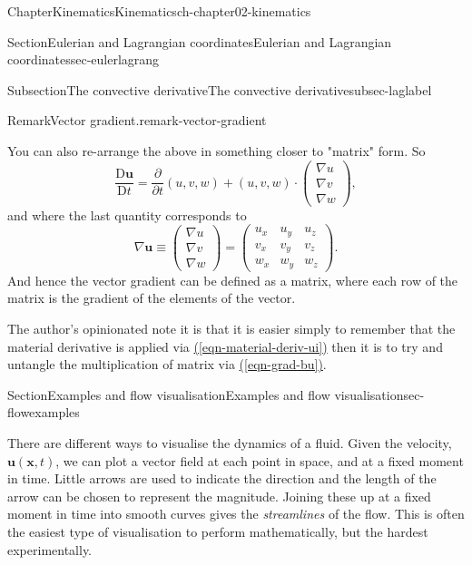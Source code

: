 \documentclass[oneside,10pt,]{book}
\newcommand{\xreffont}{\relax}
\numberwithin{equation}{section}
\newcommand{\DD}[2]{\frac{\mathrm{D}#1}{\mathrm{D}#2}}
\newcommand{\pd}[2]{\frac{\partial#1}{\partial#2}}
\newcommand{\bx}{\boldsymbol{x}}
\newcommand{\bu}{\boldsymbol{u}}
\begin{document}
\begin{chapterptx}{Chapter}{Kinematics}{}{Kinematics}{}{}{ch-chapter02-kinematics}
\begin{sectionptx}{Section}{Eulerian and Lagrangian coordinates}{}{Eulerian and Lagrangian coordinates}{}{}{sec-eulerlagrang}
\begin{subsectionptx}{Subsection}{The convective derivative}{}{The convective derivative}{}{}{subsec-laglabel}
\begin{remark}{Remark}{Vector gradient.}{remark-vector-gradient}
%
\par
You can also re-arrange the above in something closer to "matrix" form. So%
\begin{equation*}
\DD{\bu}{t} = \pd{}{t}(u, v, w) + (u, v, w) \cdot \begin{pmatrix} \nabla u \\ \nabla v \\ \nabla w\end{pmatrix},
\end{equation*}
and where the last quantity corresponds to%
\begin{equation}
\nabla \bu \equiv \begin{pmatrix} \nabla u \\ \nabla v \\ \nabla w\end{pmatrix} = 
\begin{pmatrix}
u_x & u_y & u_z \\
v_x & v_y & v_z \\
w_x & w_y & w_z 
\end{pmatrix}.\label{eqn-grad-bu}
\end{equation}
And hence the vector gradient can be defined as a matrix, where each row of the matrix is the gradient of the elements of the vector.%
\par
The author's opinionated note it is that it is easier simply to remember that the material derivative is applied via \hyperref[eqn-material-deriv-ui]{({\xreffont\ref{eqn-material-deriv-ui}})} then it is to try and untangle the multiplication of matrix via \hyperref[eqn-grad-bu]{({\xreffont\ref{eqn-grad-bu}})}.%
\end{remark}
\end{subsectionptx}
\end{sectionptx}
%
%
\typeout{************************************************}
\typeout{************************************************}
%
\begin{sectionptx}{Section}{Examples and flow visualisation}{}{Examples and flow visualisation}{}{}{sec-flowexamples}
\begin{introduction}{}%
There are different ways to visualise the dynamics of a fluid. Given the velocity, \(\bu(\bx,
t)\), we can plot a vector field at each point in space, and at a fixed moment in time. Little arrows are used to indicate the direction and the length of the arrow can be chosen to represent the magnitude. Joining these up at a fixed moment in time into smooth curves gives the \emph{streamlines} of the flow. This is often the easiest type of visualisation to perform mathematically, but the hardest experimentally.%

\end{introduction}
\end{sectionptx}
\end{chapterptx}
\end{document}
